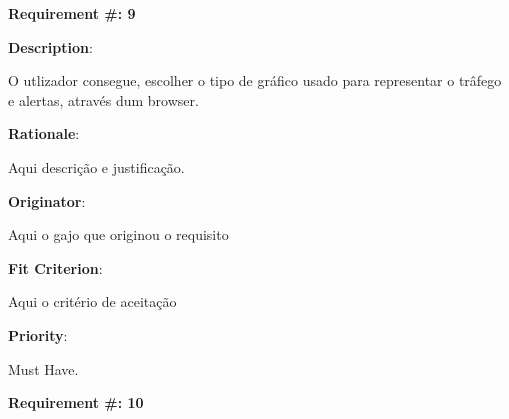\pagebreak






\begin{minipage}{0.55\textwidth}
\begin{flushleft}\textbf{Requirement \#: 9}\end{flushleft}
\end{minipage}
\begin{minipage}{0.4\textwidth}
\end{minipage}

\begin{description}
\item \textbf{Description}:

O utlizador consegue, escolher o tipo de gráfico usado para representar o trâfego e alertas, através dum browser.

\item \textbf{Rationale}:

Aqui descrição e justificação. \\
\item \textbf{Originator}:

Aqui o gajo que originou o requisito\\

\item \textbf{Fit Criterion}:

Aqui o critério de aceitação \\

\item \textbf{Priority}:

Must Have. \\

\end{description}

\pagebreak






\begin{minipage}{0.55\textwidth}
\begin{flushleft}\textbf{Requirement \#: 10}\end{flushleft}
\end{minipage}
\begin{minipage}{0.4\textwidth}
\end{minipage}

